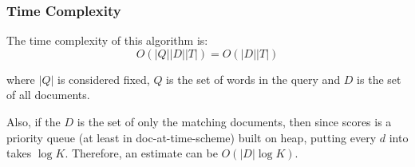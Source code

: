 \subsubsection{Time Complexity}

The time complexity of this algorithm is:
\begin{equation}
    O(|Q| |D| |T|) = O(|D| |T|)
\end{equation}

where $|Q|$ is considered fixed, $Q$ is the set of words in the query and $D$ is the set of all documents.

Also, if the $D$ is the set of only the matching documents, then
since scores is a priority queue (at least in doc-at-time-scheme) built on heap, 
putting every $d$ into takes $\log K$. Therefore, an estimate can be $O(|D| \log K )$.~\cite{tfidfComplexity}

